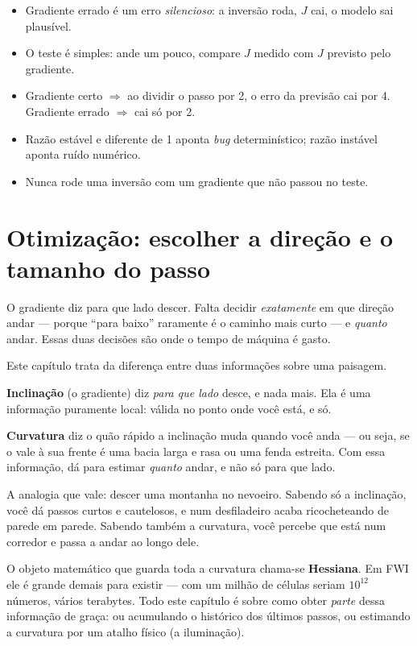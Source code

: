 \documentclass[11pt,a4paper,oneside]{report}
\begin{document}
\begin{resumo}
\begin{itemize}[leftmargin=*, itemsep=1pt]
\item Gradiente errado \'e um erro \emph{silencioso}: a invers\~ao roda, $J$
cai, o modelo sai plaus\'ivel.
\item O teste \'e simples: ande um pouco, compare $J$ medido com $J$ previsto
pelo gradiente.
\item Gradiente certo $\Rightarrow$ ao dividir o passo por 2, o erro da
previs\~ao cai por 4. Gradiente errado $\Rightarrow$ cai s\'o por 2.
\item Raz\~ao est\'avel e diferente de 1 aponta \emph{bug} determin\'istico;
raz\~ao inst\'avel aponta ru\'ido num\'erico.
\item Nunca rode uma invers\~ao com um gradiente que n\~ao passou no teste.
\end{itemize}
\end{resumo}

\chapter{Otimiza\c{c}\~ao: escolher a dire\c{c}\~ao e o tamanho do passo}
\label{cap:otimizacao}

\begin{ideia}
O gradiente diz para que lado descer. Falta decidir \emph{exatamente} em que
dire\c{c}\~ao andar --- porque ``para baixo'' raramente \'e o caminho mais
curto --- e \emph{quanto} andar. Essas duas decis\~oes s\~ao onde o tempo de
m\'aquina \'e gasto.
\end{ideia}

\begin{matematica}
Este cap\'itulo trata da diferen\c{c}a entre duas informa\c{c}\~oes sobre uma
paisagem.

\textbf{Inclina\c{c}\~ao} (o gradiente) diz \emph{para que lado} desce, e
nada mais. Ela \'e uma informa\c{c}\~ao puramente local: v\'alida no ponto
onde voc\^e est\'a, e s\'o.

\textbf{Curvatura} diz o qu\~ao r\'apido a inclina\c{c}\~ao muda quando
voc\^e anda --- ou seja, se o vale \`a sua frente \'e uma bacia larga e rasa
ou uma fenda estreita. Com essa informa\c{c}\~ao, d\'a para estimar
\emph{quanto} andar, e n\~ao s\'o para que lado.

A analogia que vale: descer uma montanha no nevoeiro. Sabendo s\'o a
inclina\c{c}\~ao, voc\^e d\'a passos curtos e cautelosos, e num desfiladeiro
acaba ricocheteando de parede em parede. Sabendo tamb\'em a curvatura, voc\^e
percebe que est\'a num corredor e passa a andar ao longo dele.

O objeto matem\'atico que guarda toda a curvatura chama-se \textbf{Hessiana}.
Em FWI ele \'e grande demais para existir --- com um milh\~ao de c\'elulas
seriam $10^{12}$ n\'umeros, v\'arios terabytes. Todo este cap\'itulo \'e sobre
como obter \emph{parte} dessa informa\c{c}\~ao de gra\c{c}a: ou acumulando o
hist\'orico dos \'ultimos passos, ou estimando a curvatura por um atalho
f\'isico (a ilumina\c{c}\~ao).
\end{matematica}
\end{document}
